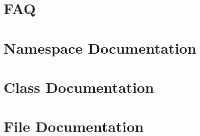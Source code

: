 \documentclass[twoside]{article}
\newcommand{\+}{\discretionary{\mbox{\scriptsize$\hookleftarrow$}}{}{}}
\newcommand{\clearemptydoublepage}{%
  \newpage{\pagestyle{empty}\cleardoublepage}%
}
\begin{document}
\section{F\+AQ}
\label{md_documentation__f_a_q}

\section{Namespace Documentation}



\section{Class Documentation}
































\section{File Documentation}





















\newpage
{}
\clearemptydoublepage
{}
\printindex
\end{document}
